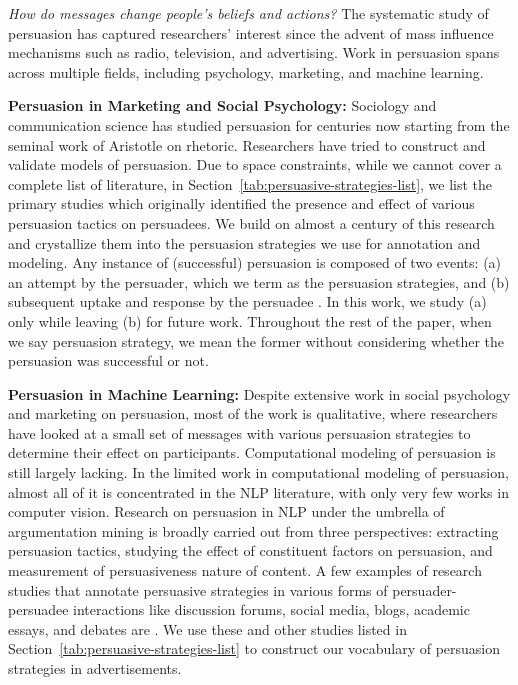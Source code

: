 \documentclass[hidelinks,11pt,a4paper]{report}
\renewcommand{\cite}[1]{\citep{#1}}
\begin{document}
\textit{How do messages change people's beliefs and actions?} The systematic study of persuasion has captured researchers’ interest since the advent of mass influence mechanisms such as radio, television, and advertising. Work in persuasion spans across multiple fields, including psychology, marketing, and machine learning. 


\textbf{Persuasion in Marketing and Social Psychology:} Sociology and communication science has studied persuasion for centuries now starting from the seminal work of Aristotle on rhetoric. Researchers have tried to construct and validate models of persuasion. Due to space constraints, while we cannot cover a complete list of literature, in Section~\ref{tab:persuasive-strategies-list}, we list the primary studies which originally identified the presence and effect of various persuasion tactics on persuadees. We build on almost a century of this research and crystallize them into the persuasion strategies we use for annotation and modeling. %
Any instance of (successful) persuasion is composed of two events: (a) an attempt by the persuader, which we term as the persuasion strategies, and (b) subsequent uptake and response by the persuadee \cite{anand2011believe,vakratsas1999advertising}. In this work, we study (a) only while leaving (b) for future work. Throughout the rest of the paper, when we say persuasion strategy, we mean the former without considering whether the persuasion was successful or not. 



\textbf{Persuasion in Machine Learning:} Despite extensive work in social psychology and marketing on persuasion, most of the work is qualitative, where researchers have looked at a small set of messages with various persuasion strategies to determine their effect on participants. Computational modeling of persuasion is still largely lacking. In the limited work in computational modeling of persuasion, almost all of it is concentrated in the NLP literature, with only very few works in computer vision.
Research on persuasion in NLP under the umbrella of argumentation mining is broadly carried out from three perspectives: extracting persuasion tactics, studying the effect of constituent factors on persuasion, and measurement of persuasiveness nature of content. A few examples of research studies that annotate persuasive strategies in various forms of persuader-persuadee interactions like discussion forums, social media, blogs, academic essays, and debates are \cite{anand2011believe,tan2016winning,chen2021weakly}. We use these and other studies listed in Section~\ref{tab:persuasive-strategies-list} to construct our vocabulary of persuasion strategies in advertisements. 
\end{document}
